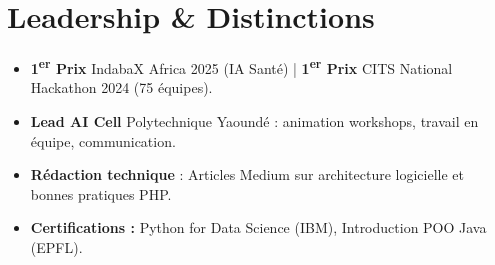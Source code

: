 \documentclass[a4paper,11pt]{article}
\begin{document}
\section{Leadership \& Distinctions}
\begin{itemize}[leftmargin=*, label=\tiny$\bullet$, nosep]
    \item \small{\textbf{1\textsuperscript{er} Prix} IndabaX Africa 2025 (IA Santé) | \textbf{1\textsuperscript{er} Prix} CITS National Hackathon 2024 (75 équipes).}
    \item \small{\textbf{Lead AI Cell} Polytechnique Yaoundé : animation workshops, travail en équipe, communication.}
    \item \small{\textbf{Rédaction technique} : Articles Medium sur architecture logicielle et bonnes pratiques PHP.}
    \item \small{\textbf{Certifications :} Python for Data Science (IBM), Introduction POO Java (EPFL).}
\end{itemize}
\end{document}
